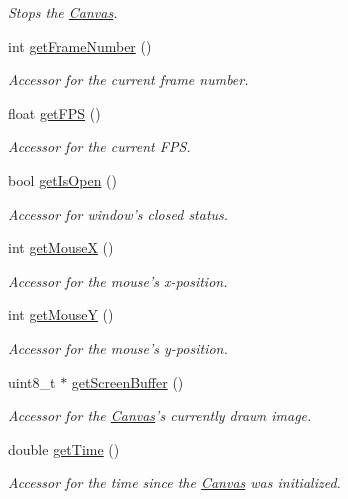\begin{DoxyCompactItemize}
\begin{DoxyCompactList}\small\item\em Stops the \hyperlink{class_canvas}{Canvas}. \end{DoxyCompactList}\item 
int \hyperlink{class_canvas_a2f17624ba40bc6f98d3675e76c1819d7}{get\+Frame\+Number} ()
\begin{DoxyCompactList}\small\item\em Accessor for the current frame number. \end{DoxyCompactList}\item 
float \hyperlink{class_canvas_a7f5828da2f39dee2602ff624dbe04786}{get\+F\+P\+S} ()
\begin{DoxyCompactList}\small\item\em Accessor for the current F\+P\+S. \end{DoxyCompactList}\item 
bool \hyperlink{class_canvas_ae409ea5d1261a8ad8bb9ef994ffc1c22}{get\+Is\+Open} ()
\begin{DoxyCompactList}\small\item\em Accessor for window's closed status. \end{DoxyCompactList}\item 
int \hyperlink{class_canvas_af5f179835589d447f13544709314c014}{get\+Mouse\+X} ()
\begin{DoxyCompactList}\small\item\em Accessor for the mouse's x-\/position. \end{DoxyCompactList}\item 
int \hyperlink{class_canvas_aad34a217c015181b9457a5c02e8aa8f2}{get\+Mouse\+Y} ()
\begin{DoxyCompactList}\small\item\em Accessor for the mouse's y-\/position. \end{DoxyCompactList}\item 
uint8\+\_\+t $\ast$ \hyperlink{class_canvas_a741d355d9f2021c28e048fc9614e3db2}{get\+Screen\+Buffer} ()
\begin{DoxyCompactList}\small\item\em Accessor for the \hyperlink{class_canvas}{Canvas}'s currently drawn image. \end{DoxyCompactList}\item 
double \hyperlink{class_canvas_a3f212a576d46a0546a86919f4c9fbb57}{get\+Time} ()
\begin{DoxyCompactList}\small\item\em Accessor for the time since the \hyperlink{class_canvas}{Canvas} was initialized. \end{DoxyCompactList}\item 

\end{DoxyCompactItemize}

